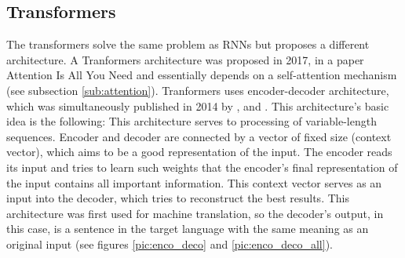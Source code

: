 \subsection{Transformers}
\label{sub:transformers}
The transformers solve the same problem as RNNs but proposes a different architecture. A Tranformers architecture was proposed in 2017, in a paper Attention Is All You Need \citep{Vaswani2017} and essentially depends on a self-attention mechanism (see subsection \ref{sub:attention}). %
Tranformers uses encoder-decoder architecture, which was simultaneously published in 2014 by \citep{Cho2014}, \citep{Sutskever2014} and \citep{Wu2016}. This architecture's basic idea is the following: This architecture serves to processing of variable-length sequences. Encoder and decoder are connected by a vector of fixed size (context vector), which aims to be a good representation of the input. %
The encoder reads its input and tries to learn such weights that the encoder's final representation of the input contains all important information. This context vector serves as an input into the decoder, which tries to reconstruct the best results. This architecture was first used for machine translation, so the decoder's output, in this case, is a sentence in the target language with the same meaning as an original input (see figures \ref{pic:enco_deco}  and \ref{pic:enco_deco_all}).
